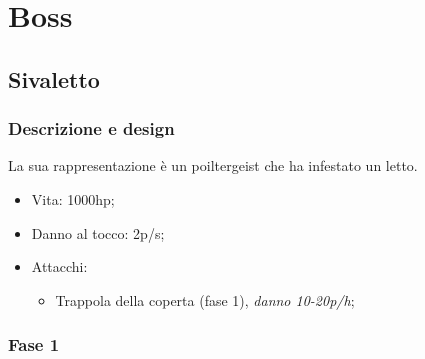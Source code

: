 \section{Boss}
    \subsection{Sivaletto}
        
        \subsubsection{Descrizione e design}
            La sua rappresentazione è un poiltergeist che ha infestato un letto.\\
            \begin{itemize}
                \item{Vita: 1000hp;}
                \item{Danno al tocco: 2p/s;}
                \item{Attacchi:
                    \begin{itemize}
                        \item{Trappola della coperta (fase 1), \emph{danno 10-20p/h};}
                    \end{itemize}
                }
            \end{itemize}
            
        \subsubsection{Fase 1}
    

